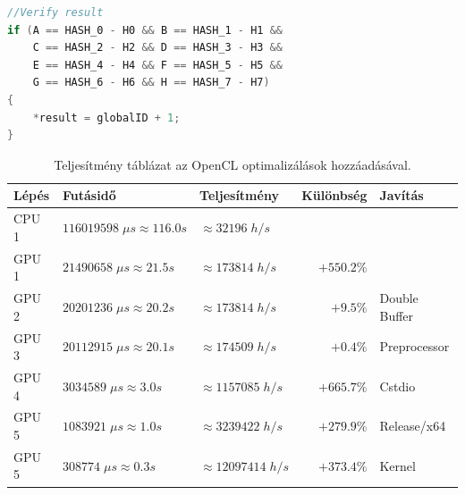 \begin{lstlisting}[language={C++}]
//Verify result
if (A == HASH_0 - H0 && B == HASH_1 - H1 &&
    C == HASH_2 - H2 && D == HASH_3 - H3 &&
    E == HASH_4 - H4 && F == HASH_5 - H5 &&
    G == HASH_6 - H6 && H == HASH_7 - H7)
{
    *result = globalID + 1;
}
\end{lstlisting}

\begin{table}[H]
    \centering
    \begin{tabular}{l|l|l|r|l}
        \textbf{Lépés} & \textbf{Futásidő} & \textbf{Teljesítmény} & \textbf{Különbség} & \textbf{Javítás} \\
        \hline
        \hline
        
        CPU 1 & $\num{116 019 598} \; \mu s \approx \num{116.0}s $ & $\approx \num{32 196} \; h/s$ & & \\
        \hline
                            
        GPU 1 & $\num{21 490 658} \; \mu s \approx \num{21.5}s $ & $\approx \num{173 814} \; h/s$ & $+550.2\%$ & \\
        \hline
        
        GPU 2 & $\num{20 201 236} \; \mu s \approx \num{20.2}s $ & $\approx \num{173 814} \; h/s$ & $+9.5\%$ & Double Buffer \\
        \hline
        
        GPU 3 & $\num{20 112 915} \; \mu s \approx \num{20.1}s $ & $\approx \num{174 509} \; h/s$ & $+0.4\%$ & Preprocessor \\
        \hline
        
        GPU 4 & $\num{3 034 589} \; \mu s \approx \num{3.0}s $ & $\approx \num{1 157 085} \; h/s$ & $+665.7\%$ & Cstdio \\
        \hline
        
        GPU 5 & $\num{1 083 921} \; \mu s \approx \num{1.0}s $ & $\approx \num{3 239 422} \; h/s$ & $+279.9\%$ & Release/x64 \\
        \hline
        
        GPU 5 & $\num{308 774} \; \mu s \approx \num{0.3}s $ & $\approx \num{12 097 414} \; h/s$ & $+373.4\%$ & Kernel \\
        
    \end{tabular}
    \caption{Teljesítmény táblázat az OpenCL optimalizálások hozzáadásával.}
\end{table}

